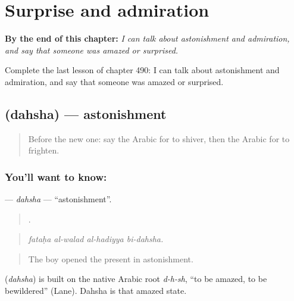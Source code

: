 
\chapter{Surprise and admiration}
\label{ch:ar-surprise-and-admiration}

\begin{chapteropening}
\textbf{By the end of this chapter:} \emph{I can talk about astonishment and admiration, and say that someone was amazed or surprised.}

Complete the last lesson of chapter 490: I can talk about astonishment and admiration, and say that someone was amazed or surprised.
\end{chapteropening}

\section[\texorpdfstring{\ar{دهشة} (dahsha)}{دهشة (dahsha)}]{ (dahsha) — astonishment}

\label{lesson:AR-C490-dahsha}



\begin{quote}
Before the new one: say the Arabic for to shiver, then the Arabic for to frighten.
\end{quote}

\subsection*{You'll want to know: }
\textbf{} — \emph{dahsha} — \textquotedblleft{}astonishment\textquotedblright{}.

\begin{quote}
   .
\end{quote}

\begin{quote}
\emph{fataḥa al-walad al-hadiyya bi-dahsha.}
\end{quote}

\begin{quote}
The boy opened the present in astonishment.
\end{quote}

\begin{cousinweb}
\textbf{} (\emph{dahsha}) is built on the native Arabic root \emph{d-h-sh}, \textquotedblleft{}to be amazed, to be bewildered\textquotedblright{} (Lane). Dahsha is that amazed state.
\end{cousinweb}

